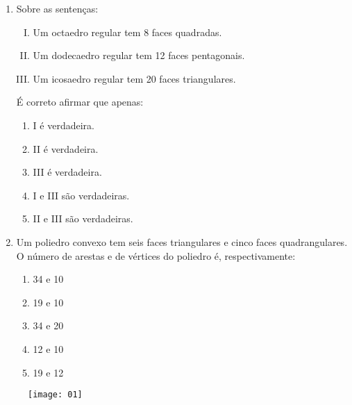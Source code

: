 \documentclass[oneside,a4paper,12pt]{article}
\begin{document}
\begin{enumerate}
\item  Sobre as sentenças:
\begin{enumerate}[I.]
\item Um octaedro regular tem 8 faces quadradas.
\item Um dodecaedro regular tem 12 faces pentagonais.
\item Um icosaedro regular tem 20 faces triangulares.
\end{enumerate}

É correto afirmar que apenas:
\begin{enumerate}
\item I é verdadeira.
\item II é verdadeira.
\item III é verdadeira.
\item I e III são verdadeiras.
\item II e III são verdadeiras.
\end{enumerate}

\item  Um poliedro convexo tem seis faces triangulares e cinco faces quadrangulares. O número de arestas e de vértices do poliedro é, respectivamente:
\begin{enumerate}
\item 34 e 10
\item 19 e 10
\item 34 e 20
\item 12 e 10
\item 19 e 12
\end{enumerate}
\end{enumerate}


\begin{exercicio}

\begin{figure}[!htb]
\center
\texttt{[image: 01]}
\end{figure}

\end{exercicio}
\end{document}
